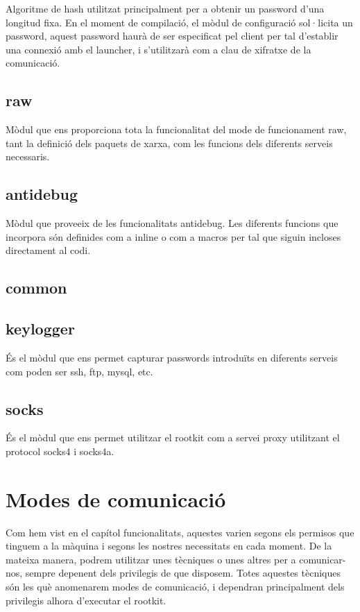 Algoritme de hash utilitzat principalment per a obtenir un password d'una longitud fixa. En el moment
de compilació, el mòdul de configuració sol·licita un password, aquest password haurà de ser especificat
pel client per tal d'establir una connexió amb el launcher, i s'utilitzarà com a clau de xifratxe
de la comunicació.

\subsection{raw}

Mòdul que ens proporciona tota la funcionalitat del mode de funcionament raw, tant la definició dels
paquets de xarxa, com les funcions dels diferents serveis necessaris.

\subsection{antidebug}

Mòdul que proveeix de les funcionalitats antidebug. Les diferents funcions que incorpora són definides
com a inline o com a macros per tal que siguin incloses directament al codi.

\subsection{common}


\subsection{keylogger}

És el mòdul que ens permet capturar passwords introduïts en diferents serveis com poden ser ssh, ftp, mysql, etc.
\subsection{socks}

És el mòdul que ens permet utilitzar el rootkit com a servei proxy utilitzant el protocol socks4 i socks4a.
\section{Modes de comunicació}

Com hem vist en el capítol funcionalitats, aquestes varien segons els permisos que tinguem a la màquina 
i segons les nostres necessitats en cada moment. De la mateixa manera, podrem utilitzar unes tècniques o unes altres
per a comunicar-nos, sempre depenent dels privilegis de que disposem. Totes aquestes tècniques són les què anomenarem modes
de comunicació, i dependran principalment dels privilegis alhora d'executar el rootkit.\\

